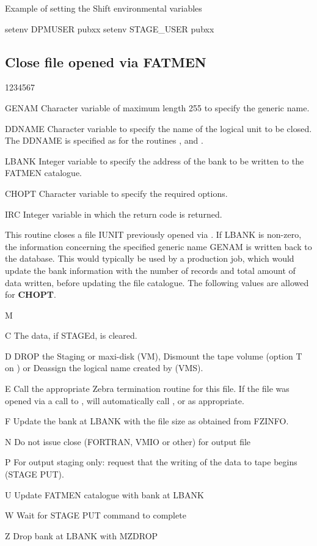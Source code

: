 \begin{XMPt}{Example of setting the Shift environmental variables}

setenv DPMUSER pubxx
setenv STAGE_USER pubxx

\end{XMPt}


\subsection{Close file opened via FATMEN}
\par
\begin{DLtt}{1234567}
\item[GENAM]
Character variable of maximum length 255 to specify the generic name.
\item[DDNAME]
Character variable to specify the name of the logical unit to be
closed. The DDNAME is specified as for the routines , 
 and .
\item[LBANK]
Integer variable to specify the address of the bank to be written
to the FATMEN catalogue.
\item[CHOPT]
Character variable to specify the required options.
\item[IRC]
Integer variable in which the return code is returned.
\end{DLtt}
This routine closes a file IUNIT previously opened via .
If LBANK is non-zero, the information concerning the specified
generic name GENAM is written back to the database.
This would typically be used
by a production job, which would update the bank information with
the number of records and total amount of data written, before
updating the file catalogue.
The following values are allowed for {\bf CHOPT}.
\begin{DL}{M}
\item[C]The data, if STAGEd, is cleared.
\item[D]DROP the Staging or maxi-disk (VM), Dismount the tape volume (option
T on ) or Deassign the logical name created by  (VMS).
\item[E]Call the appropriate Zebra termination routine for this file.
If the file was opened via a call to ,  will
automatically call ,  or  as 
appropriate.
\item[F]Update the bank at LBANK with the file size as obtained from FZINFO.
\item[N]Do not issue close (FORTRAN, VMIO or other) for output file
\item[P]For output staging only: request that the writing of the data
to tape begins (STAGE PUT).
\item[U]Update FATMEN catalogue with bank at LBANK
\item[W]Wait for STAGE PUT command to complete
\item[Z]Drop bank at LBANK with MZDROP
\end{DL}
